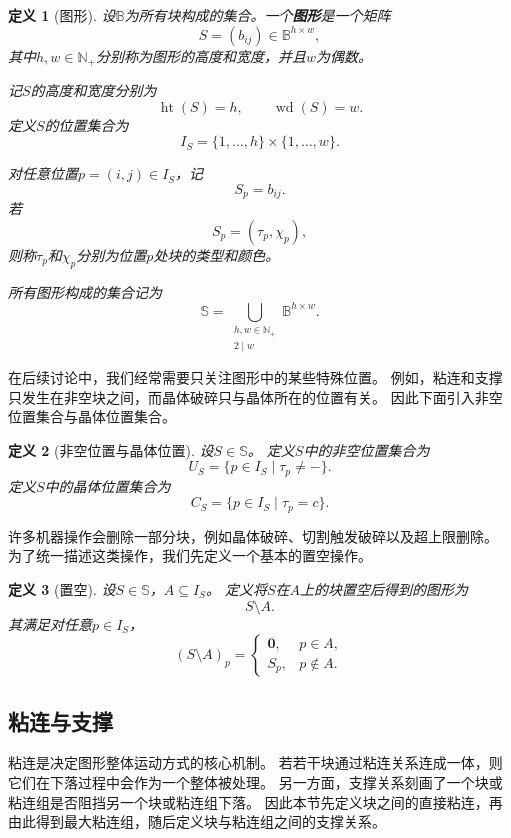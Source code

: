 \documentclass[UTF8,fontset=none]{ctexart}
\theoremstyle{cnthm}
\newtheorem{definition}{定义}[section]
\begin{document}
			\begin{definition}[图形]
				设$\mathbb{B}$为所有块构成的集合。一个\textbf{图形}是一个矩阵
				$$
				S=(b_{ij})\in \mathbb{B}^{h\times w},
				$$
				其中$h,w\in\mathbb{N}_{+}$分别称为图形的高度和宽度，并且$w$为偶数。
				
				记$S$的高度和宽度分别为
				$$
				\operatorname{ht}(S)=h,\qquad \operatorname{wd}(S)=w.
				$$
				定义$S$的位置集合为
				$$
				I_S=\{1,\dots,h\}\times\{1,\dots,w\}.
				$$
				
				对任意位置$p=(i,j)\in I_S$，记
				$$
				S_p=b_{ij}.
				$$
				若
				$$
				S_p=(\tau_p,\chi_p),
				$$
				则称$\tau_p$和$\chi_p$分别为位置$p$处块的类型和颜色。
				
				所有图形构成的集合记为
				$$
				\mathbb{S}
				=
				\bigcup_{\substack{h,w\in\mathbb{N}_{+}\\ 2\mid w}}
				\mathbb{B}^{h\times w}.
				$$
			\end{definition}
			
			在后续讨论中，我们经常需要只关注图形中的某些特殊位置。
			例如，粘连和支撑只发生在非空块之间，而晶体破碎只与晶体所在的位置有关。
			因此下面引入非空位置集合与晶体位置集合。
			
			\begin{definition}[非空位置与晶体位置]
				设$S\in\mathbb{S}$。
				定义$S$中的非空位置集合为
				$$
				U_S=\{p\in I_S\mid \tau_p\neq -\}.
				$$
				定义$S$中的晶体位置集合为
				$$
				C_S=\{p\in I_S\mid \tau_p=c\}.
				$$
			\end{definition}
			
			许多机器操作会删除一部分块，例如晶体破碎、切割触发破碎以及超上限删除。
			为了统一描述这类操作，我们先定义一个基本的置空操作。
			
			\begin{definition}[置空]
				设$S\in\mathbb{S}$，$A\subseteq I_S$。
				定义将$S$在$A$上的块置空后得到的图形为
				$$
				S\setminus A.
				$$
				其满足对任意$p\in I_S$，
				$$
				(S\setminus A)_p
				=
				\begin{cases}
					\mathbf{0}, & p\in A,\\
					S_p, & p\notin A.
				\end{cases}
				$$
			\end{definition}
			
		\subsection{粘连与支撑}
		
			粘连是决定图形整体运动方式的核心机制。
			若若干块通过粘连关系连成一体，则它们在下落过程中会作为一个整体被处理。
			另一方面，支撑关系刻画了一个块或粘连组是否阻挡另一个块或粘连组下落。
			因此本节先定义块之间的直接粘连，再由此得到最大粘连组，随后定义块与粘连组之间的支撑关系。
			
\end{document}
